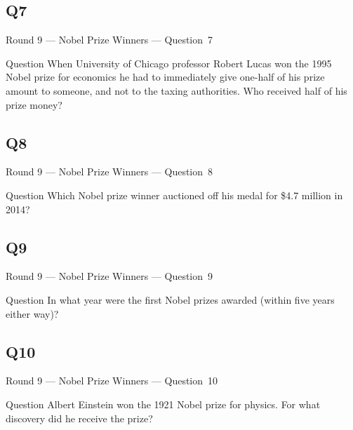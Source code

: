 \documentclass[11pt]{beamer}
\begin{document}
\subsection*{Q7}
\begin{frame}[t]{Round 9 --- Nobel Prize Winners --- \mbox{Question 7}}
\vspace{-0.5em}
\begin{block}{Question}
When University of Chicago professor Robert Lucas won the 1995 Nobel prize for economics he had to immediately give one-half of his prize amount to someone, and not to the taxing authorities. Who received half of his prize money?
\end{block}
\end{frame}
\subsection*{Q8}
\begin{frame}[t]{Round 9 --- Nobel Prize Winners --- \mbox{Question 8}}
\vspace{-0.5em}
\begin{block}{Question}
Which Nobel prize winner auctioned off his medal for \$4.7 million in 2014?
\end{block}
\end{frame}
\subsection*{Q9}
\begin{frame}[t]{Round 9 --- Nobel Prize Winners --- \mbox{Question 9}}
\vspace{-0.5em}
\begin{block}{Question}
In what year were the first Nobel prizes awarded (within five years either way)?
\end{block}
\end{frame}
\subsection*{Q10}
\begin{frame}[t]{Round 9 --- Nobel Prize Winners --- \mbox{Question 10}}
\vspace{-0.5em}
\begin{block}{Question}
Albert Einstein won the 1921 Nobel prize for physics. For what discovery did he receive the prize?
\end{block}
\end{frame}
\end{document}
